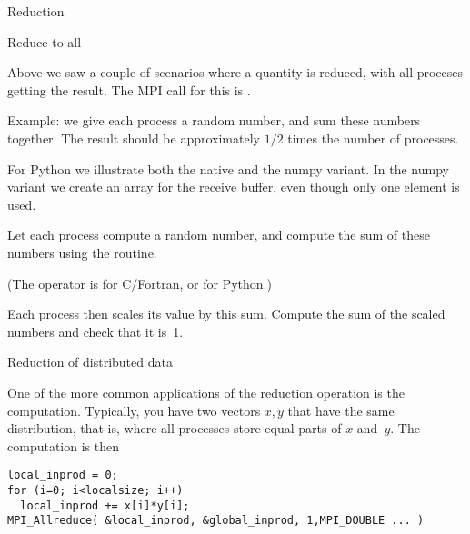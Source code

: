 
 {Reduction}

 {Reduce to all}
\label{sec:allreduce}

Above we saw a couple of scenarios where a quantity is reduced, with
all proceses getting the result. The MPI call for this is
%
.

Example: we give each process a random number, and sum these numbers together.
The result should be approximately $1/2$ times the number of processes.


For Python we illustrate both the native and the numpy variant. In the
numpy variant we create an array for the receive buffer, even though
only one element is used.


\begin{exercise}
  \label{ex:randommaxscale}
  Let each process compute a random number,
  and compute the sum of these numbers using the 
  routine.

  (The operator is  for C/Fortran, or  for
  Python.)
  
  Each process then scales its value
  by this sum. Compute the sum of the scaled numbers and check that it is~1.
\end{exercise}

 {Reduction of distributed data}
\label{sec:dist-reduc}

One of the more common applications of the reduction operation
is the  computation. Typically, you have two vectors $x,y$
that have the same distribution, that is,
where all processes store equal parts of $x$ and~$y$.
The computation is then
\begin{lstlisting}
local_inprod = 0;
for (i=0; i<localsize; i++)
  local_inprod += x[i]*y[i];
MPI_Allreduce( &local_inprod, &global_inprod, 1,MPI_DOUBLE ... ) 
\end{lstlisting}


